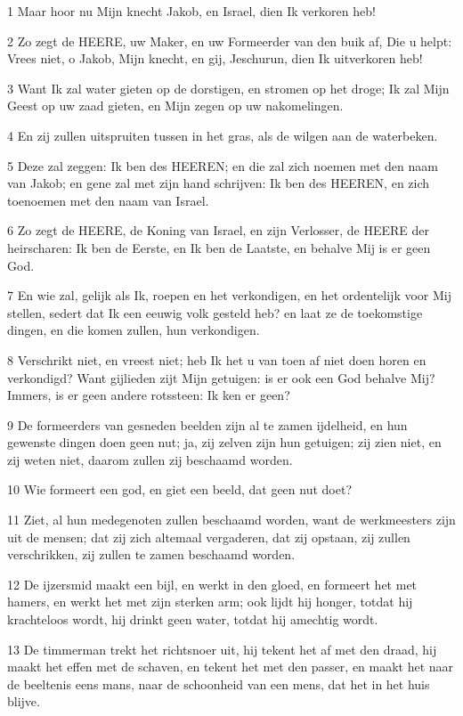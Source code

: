 \par 1 Maar hoor nu Mijn knecht Jakob, en Israel, dien Ik verkoren heb!
\par 2 Zo zegt de HEERE, uw Maker, en uw Formeerder van den buik af, Die u helpt: Vrees niet, o Jakob, Mijn knecht, en gij, Jeschurun, dien Ik uitverkoren heb!
\par 3 Want Ik zal water gieten op de dorstigen, en stromen op het droge; Ik zal Mijn Geest op uw zaad gieten, en Mijn zegen op uw nakomelingen.
\par 4 En zij zullen uitspruiten tussen in het gras, als de wilgen aan de waterbeken.
\par 5 Deze zal zeggen: Ik ben des HEEREN; en die zal zich noemen met den naam van Jakob; en gene zal met zijn hand schrijven: Ik ben des HEEREN, en zich toenoemen met den naam van Israel.
\par 6 Zo zegt de HEERE, de Koning van Israel, en zijn Verlosser, de HEERE der heirscharen: Ik ben de Eerste, en Ik ben de Laatste, en behalve Mij is er geen God.
\par 7 En wie zal, gelijk als Ik, roepen en het verkondigen, en het ordentelijk voor Mij stellen, sedert dat Ik een eeuwig volk gesteld heb? en laat ze de toekomstige dingen, en die komen zullen, hun verkondigen.
\par 8 Verschrikt niet, en vreest niet; heb Ik het u van toen af niet doen horen en verkondigd? Want gijlieden zijt Mijn getuigen: is er ook een God behalve Mij? Immers, is er geen andere rotssteen: Ik ken er geen?
\par 9 De formeerders van gesneden beelden zijn al te zamen ijdelheid, en hun gewenste dingen doen geen nut; ja, zij zelven zijn hun getuigen; zij zien niet, en zij weten niet, daarom zullen zij beschaamd worden.
\par 10 Wie formeert een god, en giet een beeld, dat geen nut doet?
\par 11 Ziet, al hun medegenoten zullen beschaamd worden, want de werkmeesters zijn uit de mensen; dat zij zich altemaal vergaderen, dat zij opstaan, zij zullen verschrikken, zij zullen te zamen beschaamd worden.
\par 12 De ijzersmid maakt een bijl, en werkt in den gloed, en formeert het met hamers, en werkt het met zijn sterken arm; ook lijdt hij honger, totdat hij krachteloos wordt, hij drinkt geen water, totdat hij amechtig wordt.
\par 13 De timmerman trekt het richtsnoer uit, hij tekent het af met den draad, hij maakt het effen met de schaven, en tekent het met den passer, en maakt het naar de beeltenis eens mans, naar de schoonheid van een mens, dat het in het huis blijve.
